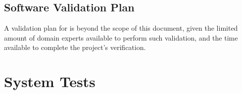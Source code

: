 \documentclass[12pt, titlepage]{article}
\begin{document}



\subsection{Software Validation Plan}

A validation plan for \progname{} is beyond the scope of this document,
given the limited amount of domain experts available to perform such validation, 
and the time available to complete the project's verification.






\section{System Tests}\label{sec:unit-test-description}
\end{document}
